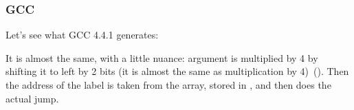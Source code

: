 

\subsubsection{\NonOptimizing GCC}
\label{switch_lot_GCC}

Let's see what GCC 4.4.1 generates:




It is almost the same, with a little nuance: argument  is multiplied by 4 by
shifting it to left by 2 bits (it is almost the same as multiplication by 4)~().
Then the address of the label is taken from the  array, stored in 
\EAX, and then  does the actual jump.

